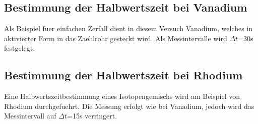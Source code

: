 \documentclass[titlepage=firstcover, captions=tableheading]{scrartcl}
\begin{document}
\subsection{Bestimmung der Halbwertszeit bei Vanadium}
Als Beispiel fuer einfachen Zerfall dient in diesem Versuch Vanadium, welches in aktivierter Form in das Zaehlrohr gesteckt wird. Als Messintervalle wird $\Delta t$=30s festgelegt.
\subsection{Bestimmung der Halbwertszeit bei Rhodium}
Eine Halbwertszeitbestimmung eines Isotopengemischs wird am Beispiel von Rhodium durchgefuehrt. Die Messung erfolgt wie bei Vanadium, jedoch wird das Messintervall auf $\Delta t$=15s verringert.
\end{document}
